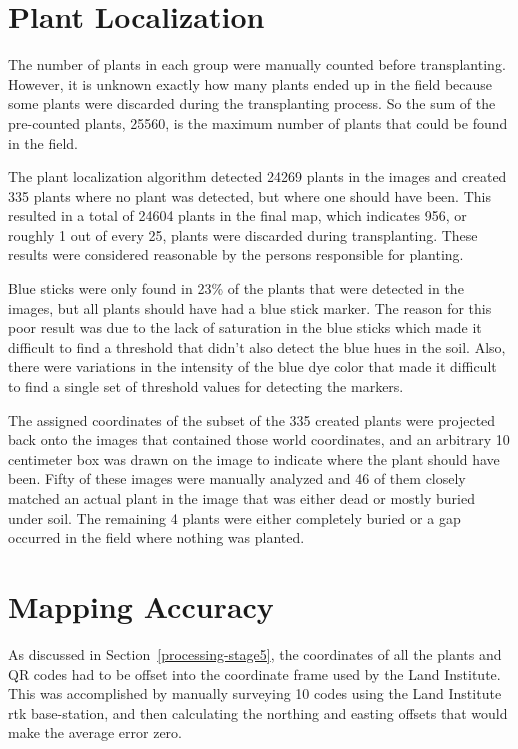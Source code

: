 \section{Plant Localization}
\label{section:plant_localization}

The number of plants in each group were manually counted before transplanting. However, it is unknown exactly how many plants ended up in the field because some plants were discarded during the transplanting process.  So the sum of the pre-counted plants, 25560, is the maximum number of plants that could be found in the field.  

The plant localization algorithm detected 24269 plants in the images and created 335 plants where no plant was detected, but where one should have been.  This resulted in a total of 24604 plants in the final map, which indicates 956, or roughly 1 out of every 25, plants were discarded during transplanting.  These results were considered reasonable by the persons responsible for planting. 

Blue sticks were only found in 23\% of the plants that were detected in the images, but all plants should have had a blue stick marker.  The reason for this poor result was due to the lack of saturation in the blue sticks which made it difficult to find a threshold that didn't also detect the blue hues in the soil.  Also, there were variations in the intensity of the blue dye color that made it difficult to find a single set of threshold values for detecting the markers.   

The assigned coordinates of the subset of the 335 created plants were projected back onto the images that contained those world coordinates, and an arbitrary 10 centimeter box was drawn on the image to indicate where the plant should have been.  Fifty of these images were manually analyzed and 46 of them closely matched an actual plant in the image that was either dead or mostly buried under soil.  The remaining 4 plants were either completely buried or a gap occurred in the field where nothing was planted.  

\section{Mapping Accuracy}

As discussed in Section~\ref{processing-stage5}, the coordinates of all the plants and QR codes had to be offset into the coordinate frame used by the Land Institute.  This was accomplished by manually surveying 10 codes using the Land Institute \ac{rtk} base-station, and then calculating the northing and easting offsets that would make the average error zero.  


